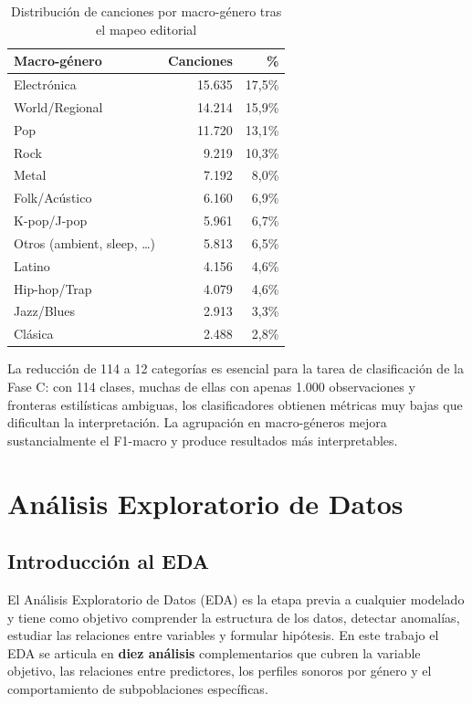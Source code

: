 \documentclass[12pt, a4paper, twoside]{book}
\theoremstyle{definition}
\begin{document}
\begin{table}[H]
\centering
\caption{Distribución de canciones por macro-género tras el mapeo editorial}
\label{tab:macrogenre}
\begin{tabular}{lrr}
\toprule
\textbf{Macro-género} & \textbf{Canciones} & \textbf{\%} \\
\midrule
Electrónica   & 15.635 & 17,5\% \\
World/Regional & 14.214 & 15,9\% \\
Pop           & 11.720 & 13,1\% \\
Rock          &  9.219 & 10,3\% \\
Metal         &  7.192 &  8,0\% \\
Folk/Acústico &  6.160 &  6,9\% \\
K-pop/J-pop   &  5.961 &  6,7\% \\
Otros (ambient, sleep, \ldots) &  5.813 &  6,5\% \\
Latino        &  4.156 &  4,6\% \\
Hip-hop/Trap  &  4.079 &  4,6\% \\
Jazz/Blues    &  2.913 &  3,3\% \\
Clásica       &  2.488 &  2,8\% \\
\bottomrule
\end{tabular}
\end{table}

La reducción de 114 a 12 categorías es esencial para la tarea de clasificación
de la Fase C: con 114 clases, muchas de ellas con apenas 1.000 observaciones y
fronteras estilísticas ambiguas, los clasificadores obtienen métricas muy bajas
que dificultan la interpretación. La agrupación en macro-géneros mejora
sustancialmente el F1-macro y produce resultados más interpretables.

\chapter{Análisis Exploratorio de Datos}

\section{Introducción al EDA}

El Análisis Exploratorio de Datos (EDA) es la etapa previa a cualquier modelado
y tiene como objetivo comprender la estructura de los datos, detectar anomalías,
estudiar las relaciones entre variables y formular hipótesis. En este trabajo el
EDA se articula en \textbf{diez análisis} complementarios que cubren la variable
objetivo, las relaciones entre predictores, los perfiles sonoros por género y el
comportamiento de subpoblaciones específicas.
\end{document}
